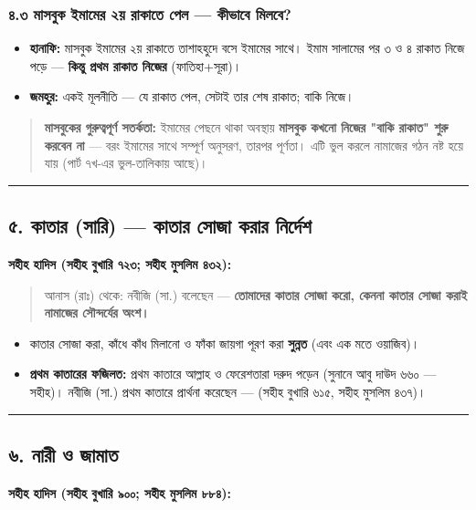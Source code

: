 \subsubsection*{৪.৩ মাসবুক ইমামের ২য় রাকাতে পেল — কীভাবে মিলবে?}

\begin{itemize}
\item \textbf{হানাফি:} মাসবুক ইমামের ২য় রাকাতে তাশাহহুদে বসে ইমামের সাথে। ইমাম সালামের পর ৩ ও ৪ রাকাত নিজে পড়ে — \textbf{কিন্তু প্রথম রাকাত নিজের} (ফাতিহা+সূরা)।
\item \textbf{জমহুর:} একই মূলনীতি — যে রাকাত পেল, সেটাই তার শেষ রাকাত; বাকি নিজে।
\end{itemize}
\begin{quote}
\textbf{মাসবুকের গুরুত্বপূর্ণ সতর্কতা:} ইমামের পেছনে থাকা অবস্থায় \textbf{মাসবুক কখনো নিজের "বাকি রাকাত" শুরু করবেন না} — বরং ইমামের সাথে সম্পূর্ণ অনুসরণ, তারপর পূর্ণতা। এটি ভুল করলে নামাজের গঠন নষ্ট হয়ে যায় (পার্ট ৭খ-এর ভুল-তালিকায় আছে)।
\end{quote}

\medskip\hrule\medskip

\subsection*{৫. কাতার (সারি) — কাতার সোজা করার নির্দেশ}

\textbf{সহীহ হাদিস (সহীহ বুখারি ৭২৩; সহীহ মুসলিম ৪৩২):}

\begin{quote}
আনাস (রাঃ) থেকে: নবীজি (সা.) বলেছেন — \textbf{তোমাদের কাতার সোজা করো, কেননা কাতার সোজা করাই নামাজের সৌন্দর্যের অংশ।}
\end{quote}

\begin{itemize}
\item কাতার সোজা করা, কাঁধে কাঁধ মিলানো ও ফাঁকা জায়গা পূরণ করা \textbf{সুন্নত} (এবং এক মতে ওয়াজিব)।
\item \textbf{প্রথম কাতারের ফজিলত:} প্রথম কাতারে আল্লাহ ও ফেরেশতারা দরুদ পড়েন (সুনানে আবু দাউদ ৬৬০ — সহীহ)। নবীজি (সা.) প্রথম কাতারে প্রার্থনা করেছেন — (সহীহ বুখারি ৬১৫, সহীহ মুসলিম ৪৩৭)।
\end{itemize}
\medskip\hrule\medskip

\subsection*{৬. নারী ও জামাত}

\textbf{সহীহ হাদিস (সহীহ বুখারি ৯০০; সহীহ মুসলিম ৮৮৪):}

